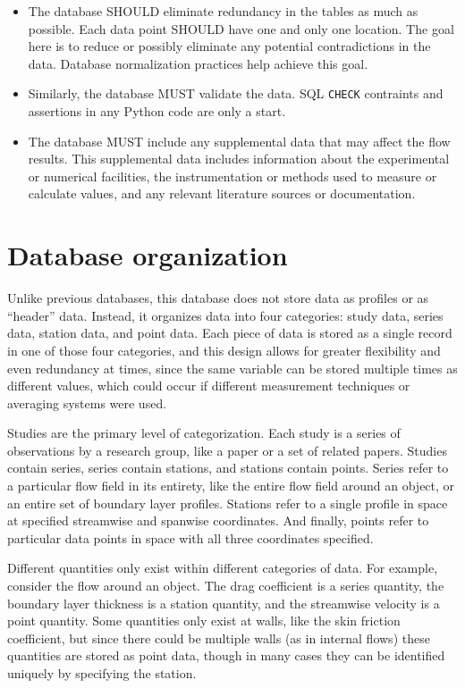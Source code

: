 \begin{itemize}
\begin{enumerate}
    \end{enumerate}

\item The database SHOULD eliminate redundancy in the tables as much as
possible.  Each data point SHOULD have one and only one location.  The goal
here is to reduce or possibly eliminate any potential contradictions in the
data.  Database normalization practices help achieve this goal.

\item Similarly, the database MUST validate the data.  SQL \texttt{CHECK}
contraints and assertions in any Python code are only a start.

\item The database MUST include any supplemental data that may affect the flow
results.  This supplemental data includes information about the experimental or
numerical facilities, the instrumentation or methods used to measure or
calculate values, and any relevant literature sources or documentation.

\end{itemize}


\section{Database organization}

Unlike previous databases, this database does not store data as profiles or as
``header'' data.  Instead, it organizes data into four categories: study data,
series data, station data, and point data.  Each piece of data is stored as a
single record in one of those four categories, and this design allows for
greater flexibility and even redundancy at times, since the same variable can
be stored multiple times as different values, which could occur if different
measurement techniques or averaging systems were used.

Studies are the primary level of categorization.  Each study is a series of
observations by a research group, like a paper or a set of related papers.
Studies contain series, series contain stations, and stations contain points.
Series refer to a particular flow field in its entirety, like the entire flow
field around an object, or an entire set of boundary layer profiles.  Stations
refer to a single profile in space at specified streamwise and spanwise
coordinates.  And finally, points refer to particular data points in space with
all three coordinates specified.

Different quantities only exist within different categories of data.  For
example, consider the flow around an object.  The drag coefficient is a series
quantity, the boundary layer thickness is a station quantity, and the
streamwise velocity is a point quantity.  Some quantities only exist at walls,
like the skin friction coefficient, but since there could be multiple walls (as
in internal flows) these quantities are stored as point data, though in many
cases they can be identified uniquely by specifying the station.

